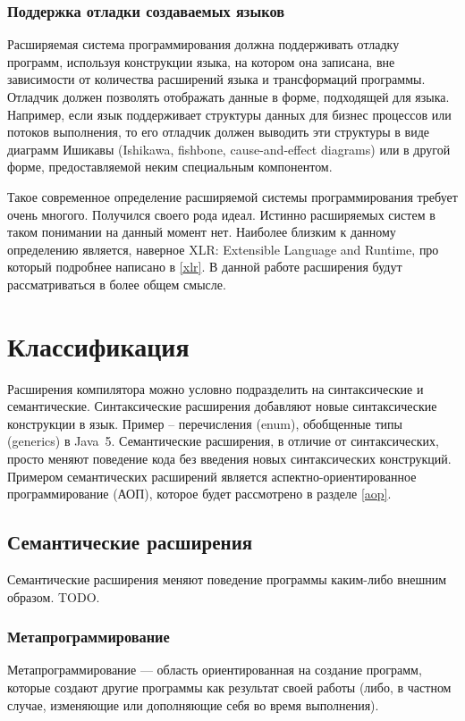 \documentclass[a4paper,12pt]{article}
\begin{document}
\subsubsection*{Поддержка отладки создаваемых языков}
Расширяемая система программирования должна поддерживать отладку программ,
используя конструкции языка, на котором она записана, вне зависимости от
количества расширений языка и трансформаций программы. Отладчик должен
позволять отображать данные в форме, подходящей для языка. Например, если язык
поддерживает структуры данных для бизнес процессов или потоков выполнения, то
его отладчик должен выводить эти структуры в виде диаграмм Ишикавы
\cite{ishikawa} (Ishikawa, fishbone, cause-and-effect diagrams) или в другой
форме, предоставляемой неким специальным компонентом.

Такое современное определение расширяемой системы программирования требует
очень многого. Получился своего рода идеал. Истинно расширяемых систем в таком
понимании на данный момент нет. Наиболее близким к данному определению
является, наверное XLR: Extensible Language and Runtime, про который подробнее
написано в \ref{xlr}. В данной работе расширения будут рассматриваться в более
общем смысле.

\section{Классификация}
\label{clas}

Расширения компилятора можно условно подразделить на синтаксические и
семантические. Синтаксические расширения добавляют новые синтаксические
конструкции в язык. Пример -- перечисления (enum), обобщенные типы (generics) в
Java~5. Семантические расширения, в отличие от синтаксических, просто меняют
поведение кода без введения новых синтаксических конструкций. Примером
семантических расширений является аспектно-ориентированное программирование
(АОП), которое будет рассмотрено в разделе \ref{aop}.

\subsection{Семантические расширения}

Семантические расширения меняют поведение программы каким-либо внешним образом.
TODO.

\subsubsection*{Метапрограммирование}
Метапрограммирование — область ориентированная на создание программ, которые
создают другие программы как результат своей работы (либо, в частном случае,
изменяющие или дополняющие себя во время выполнения).
\end{document}
